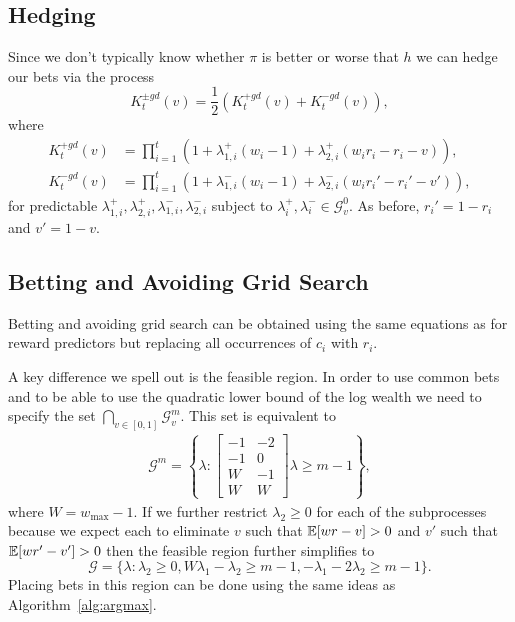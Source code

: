 \subsection{Hedging}
Since we don't typically know whether $\pi$ is better or 
worse that $h$ we can hedge our bets via the process
\[
K_{t}^{\pm gd}(v) =\frac{1}{2} (K_{t}^{+gd}(v)+K_{t}^{-gd}(v)),
\]
where 
\begin{align*}
    K_{t}^{+ gd}(v) &=\prod_{i=1}^t \left(1+\lambda_{1,i}^{+} (w_i-1) + \lambda_{2,i}^{+} (w_ir_i -r_i -v)\right),  \\
    K_{t}^{- gd}(v) &=\prod_{i=1}^t \left(1+\lambda_{1,i}^{-} (w_i-1) + \lambda_{2,i}^{-} (w_ir_i' -r_i' -v')\right) ,
\end{align*}
for predictable 
$\lambda_{1,i}^{+},\lambda_{2,i}^{+}, \lambda_{1,i}^{-},\lambda_{2,i}^{-}$
subject to $\lambda_i^{+},\lambda_{i}^{-} \in \mathcal{G}_{v}^0$.
As before, $r_i'=1-r_i$ and $v'=1-v$. 

\subsection{Betting and Avoiding Grid Search}
Betting and avoiding grid search can be obtained using 
the same equations as for reward predictors but replacing 
all occurrences of $c_i$ with $r_i$.

A key difference we spell out is the feasible region. In
order to use common bets and to be able to use the 
quadratic lower bound of the log wealth we need to 
specify the set $\bigcap_{v\in [0,1]} \mathcal{G}_v^{m}$.
This set is equivalent to
\begin{align*}
\mathcal{G}^m = \left\{\lambda:  
\left[\begin{array}{cc}
-1 & -2 \\ 
-1 & 0 \\
W &  -1\\
W & W
\end{array}\right]
\lambda \geq m - 1 \label{eq:gd-explicit-domain}
\right\},
\end{align*}
where $W = w_{\max}-1$. If we further restrict $\lambda_2 \geq 0$
for each of the subprocesses because we expect each to eliminate 
$v$ such that $\mathbb{E}[wr-v]>0$ and $v'$ such that $\mathbb{E}[wr'-v']>0$ 
then the feasible region further simplifies to 
\[
\mathcal{G} = \{\lambda: \lambda_2\geq 0,
W\lambda_1 -\lambda_2 \geq m-1, 
-\lambda_1 -2 \lambda_2 \geq m-1 \}.
\]
Placing bets in this region can be done using the same 
ideas as Algorithm~\ref{alg:argmax}.

